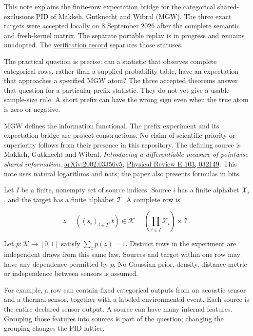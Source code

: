 This note explains the finite-row expectation bridge for the categorical shared-exclusions PID of Makkeh, Gutknecht and Wibral (MGW). The three exact targets were accepted locally on 8 September 2026 after the complete semantic and fresh-kernel matrix. The separate portable replay is in progress and remains unadopted. The \href{../../evidence/prefix-mgw-mean-formal-verification-2026-09-08/RESULTS.md}{verification record} separates those statuses.

The practical question is precise: can a statistic that observes complete categorical rows, rather than a supplied probability table, have an expectation that approaches a specified MGW atom? The three accepted theorems answer that question for a particular prefix statistic. They do not yet give a usable sample-size rule. A short prefix can have the wrong sign even when the true atom is zero or negative.

MGW defines the information functional. The prefix experiment and its expectation bridge are project constructions. No claim of scientific priority or superiority follows from their presence in this repository. The defining source is Makkeh, Gutknecht and Wibral, \emph{Introducing a differentiable measure of pointwise shared information}, \href{https://arxiv.org/abs/2002.03356v5}{arXiv:2002.03356v5}, \href{https://doi.org/10.1103/PhysRevE.103.032149}{Physical Review E 103, 032149}. This note uses natural logarithms and nats; the paper also presents formulas in bits.

\label{data-law-and-information-question}

Let \(I\) be a finite, nonempty set of source indices. Source \(i\) has a finite alphabet \(\mathcal X_i\), and the target has a finite alphabet \(\mathcal T\). A complete row is

\[
z=((s_i)_{i\in I},t)\in\mathcal K
   =\left(\prod_{i\in I}\mathcal X_i\right)\times\mathcal T.
\]

Let \(p:\mathcal K\to[0,1]\) satisfy \(\sum_zp(z)=1\). Distinct rows in the experiment are independent draws from this same law. Sources and target within one row may have any dependence permitted by \(p\). No Gaussian prior, density, distance metric or independence between sensors is assumed.

For example, a row can contain fixed categorical outputs from an acoustic sensor and a thermal sensor, together with a labeled environmental event. Each source is the entire declared sensor output. A source can have many internal features. Grouping those features into sources is part of the question; changing the grouping changes the PID lattice.

